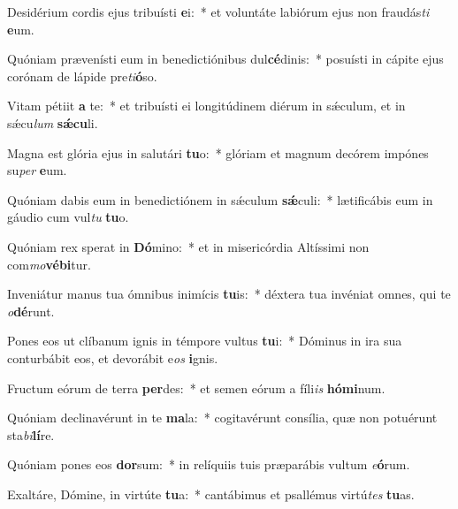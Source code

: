 \item Desidérium cordis ejus tribuísti \textbf{e}i:~* et voluntáte labiórum ejus non fraudás\textit{ti} \textbf{e}um.
\item Quóniam prævenísti eum in benedictiónibus dul\textbf{cé}dinis:~* posuísti in cápite ejus corónam de lápide pre\textit{ti}\textbf{ó}so.
\item Vitam pétiit \textbf{a} te:~* et tribuísti ei longitúdinem diérum in sǽculum, et in sǽcu\textit{lum} \textbf{sǽ}\textbf{cu}li.
\item Magna est glória ejus in salutári \textbf{tu}o:~* glóriam et magnum decórem impónes su\textit{per} \textbf{e}um.
\item Quóniam dabis eum in benedictiónem in sǽculum \textbf{sǽ}culi:~* lætificábis eum in gáudio cum vul\textit{tu} \textbf{tu}o.
\item Quóniam rex sperat in \textbf{Dó}mino:~* et in misericórdia Altíssimi non com\textit{mo}\textbf{vé}\textbf{bi}tur.
\item Inveniátur manus tua ómnibus inimícis \textbf{tu}is:~* déxtera tua invéniat omnes, qui te \textit{o}\textbf{dé}runt.
\item Pones eos ut clíbanum ignis in témpore vultus \textbf{tu}i:~* Dóminus in ira sua conturbábit eos, et devorábit e\textit{os} \textbf{i}gnis.
\item Fructum eórum de terra \textbf{per}des:~* et semen eórum a fíli\textit{is} \textbf{hó}\textbf{mi}num.
\item Quóniam declinavérunt in te \textbf{ma}la:~* cogitavérunt consília, quæ non potuérunt sta\textit{bi}\textbf{lí}re.
\item Quóniam pones eos \textbf{dor}sum:~* in relíquiis tuis præparábis vultum \textit{e}\textbf{ó}rum.
\item Exaltáre, Dómine, in virtúte \textbf{tu}a:~* cantábimus et psallémus virtú\textit{tes} \textbf{tu}as.
